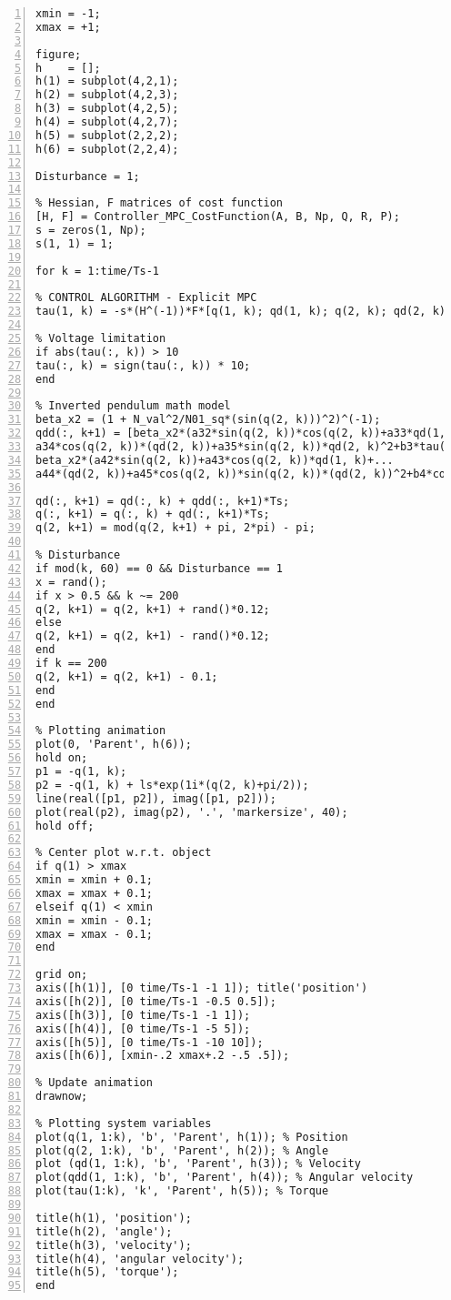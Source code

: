 \begin{lstlisting}[numbers=left,basicstyle=\scriptsize,caption={Source code of model predictive controller (Simulation).},captionpos=b]
%% Animation parameters
xmin = -1;
xmax = +1;

figure;
h    = [];
h(1) = subplot(4,2,1);
h(2) = subplot(4,2,3);
h(3) = subplot(4,2,5);
h(4) = subplot(4,2,7);
h(5) = subplot(2,2,2);
h(6) = subplot(2,2,4);

Disturbance = 1;

% Hessian, F matrices of cost function
[H, F] = Controller_MPC_CostFunction(A, B, Np, Q, R, P);
s = zeros(1, Np);
s(1, 1) = 1;

for k = 1:time/Ts-1

% CONTROL ALGORITHM - Explicit MPC
tau(1, k) = -s*(H^(-1))*F*[q(1, k); qd(1, k); q(2, k); qd(2, k)];

% Voltage limitation
if abs(tau(:, k)) > 10
tau(:, k) = sign(tau(:, k)) * 10;
end

% Inverted pendulum math model
beta_x2 = (1 + N_val^2/N01_sq*(sin(q(2, k)))^2)^(-1);
qdd(:, k+1) = [beta_x2*(a32*sin(q(2, k))*cos(q(2, k))+a33*qd(1, k)+...
a34*cos(q(2, k))*(qd(2, k))+a35*sin(q(2, k))*qd(2, k)^2+b3*tau(:, k));
beta_x2*(a42*sin(q(2, k))+a43*cos(q(2, k))*qd(1, k)+...
a44*(qd(2, k))+a45*cos(q(2, k))*sin(q(2, k))*(qd(2, k))^2+b4*cos(q(2, k))*tau(:, k))];

qd(:, k+1) = qd(:, k) + qdd(:, k+1)*Ts;        
q(:, k+1) = q(:, k) + qd(:, k+1)*Ts;
q(2, k+1) = mod(q(2, k+1) + pi, 2*pi) - pi;

% Disturbance
if mod(k, 60) == 0 && Disturbance == 1
x = rand();
if x > 0.5 && k ~= 200
q(2, k+1) = q(2, k+1) + rand()*0.12; 
else
q(2, k+1) = q(2, k+1) - rand()*0.12; 
end
if k == 200
q(2, k+1) = q(2, k+1) - 0.1;  
end
end

% Plotting animation
plot(0, 'Parent', h(6));
hold on;
p1 = -q(1, k);
p2 = -q(1, k) + ls*exp(1i*(q(2, k)+pi/2));
line(real([p1, p2]), imag([p1, p2]));
plot(real(p2), imag(p2), '.', 'markersize', 40);
hold off;

% Center plot w.r.t. object
if q(1) > xmax
xmin = xmin + 0.1;
xmax = xmax + 0.1;
elseif q(1) < xmin
xmin = xmin - 0.1;
xmax = xmax - 0.1;
end

grid on;
axis([h(1)], [0 time/Ts-1 -1 1]); title('position')
axis([h(2)], [0 time/Ts-1 -0.5 0.5]); 
axis([h(3)], [0 time/Ts-1 -1 1]); 
axis([h(4)], [0 time/Ts-1 -5 5]); 
axis([h(5)], [0 time/Ts-1 -10 10]); 
axis([h(6)], [xmin-.2 xmax+.2 -.5 .5]);

% Update animation
drawnow;

% Plotting system variables
plot(q(1, 1:k), 'b', 'Parent', h(1)); % Position 
plot(q(2, 1:k), 'b', 'Parent', h(2)); % Angle 
plot (qd(1, 1:k), 'b', 'Parent', h(3)); % Velocity
plot(qdd(1, 1:k), 'b', 'Parent', h(4)); % Angular velocity
plot(tau(1:k), 'k', 'Parent', h(5)); % Torque

title(h(1), 'position');
title(h(2), 'angle');
title(h(3), 'velocity');
title(h(4), 'angular velocity');
title(h(5), 'torque');
end
\end{lstlisting}